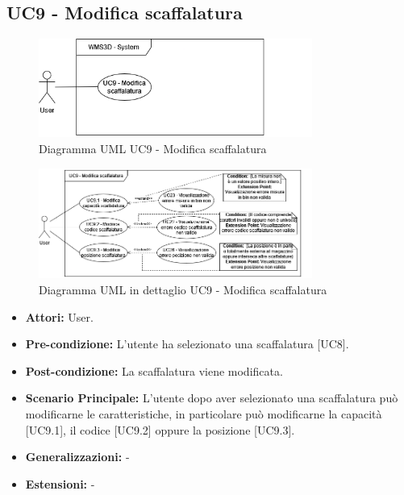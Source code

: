 \subsection{UC9 - Modifica scaffalatura}
\begin{figure}[H]
  \centering
  \includegraphics[width=0.8\textwidth]{UC_diagrams_1-10/UC9_sys.drawio.png}
   \caption{Diagramma UML UC9 - Modifica scaffalatura}
\end{figure}
\begin{figure}[H]
  \centering
  \includegraphics[width=0.8\textwidth]{UC_diagrams_1-10/UC9.drawio.png}
   \caption{Diagramma UML in dettaglio UC9 - Modifica scaffalatura}
\end{figure}
\begin{itemize}
    \item \textbf{Attori:} User.
    \item \textbf{Pre-condizione:}  L'utente ha selezionato una scaffalatura [UC8].
    \item \textbf{Post-condizione:} La scaffalatura viene modificata.
    \item \textbf{Scenario Principale:} L'utente dopo aver selezionato una scaffalatura può modificarne le caratteristiche, in particolare può modificarne la capacità [UC9.1], il codice [UC9.2] oppure la posizione [UC9.3].
    \item \textbf{Generalizzazioni:} -
    \item \textbf{Estensioni:} -
\end{itemize}


